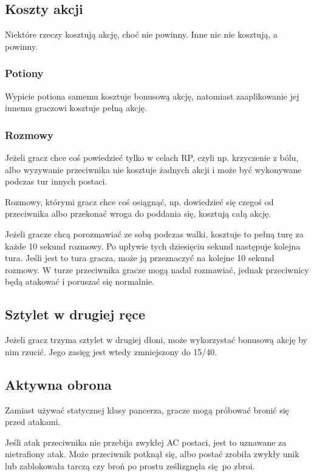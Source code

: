 \subsection{Koszty akcji}
Niektóre rzeczy kosztują akcję, choć nie powinny.	Inne  nic  nie	kosztują,  a
powinny.

\subsubsection{Potiony}
Wypicie potiona samemu kosztuje  bonusową  akcję,  natomiast  zaaplikowanie  jej
innemu graczowi kosztuje pełną akcję.

\subsubsection{Rozmowy}
Jeżeli gracz chce coś powiedzieć tylko w celach RP, czyli np. krzyczenie z bólu,
albo wyzywanie przeciwnika nie kosztuje żadnych  akcji	i  może  być  wykonywane
podczas tur innych postaci.

Rozmowy, którymi  gracz  chce  coś	osiągnąć,  np.	 dowiedzieć  się  czegoś  od
przeciwnika albo przekonać wroga do poddania się, kosztują całą akcję.

Jeżeli gracze chcą porozmawiać ze sobą podczas walki, kosztuje to pełną turę za
każde 10 sekund rozmowy. Po upływie tych dziesięciu sekund następuje kolejna
tura. Jeśli jest to tura gracza, może ją przeznaczyć na kolejne 10 sekund
rozmowy. W turze przeciwnika gracze mogą nadal rozmawiać, jednak przeciwnicy
będą atakować i poruszać się normalnie.

\subsection{Sztylet w drugiej ręce}
Jeżeli gracz trzyma sztylet w drugiej dłoni, może wykorzystać bonusową akcję by
nim rzucić. Jego zasięg jest wtedy zmniejszony do 15/40.

\subsection{Aktywna obrona}
Zamiast używać statycznej klasy pancerza, gracze mogą próbować bronić się przed
atakami.

Jeśli atak przeciwnika nie przebija zwykłej AC postaci, jest to uznawane za
nietrafiony atak. Może przeciwnik potknął się, albo postać zrobiła zwykły unik
lub zablokowała tarczą czy broń po prostu ześlizgnęła się po zbroi.

